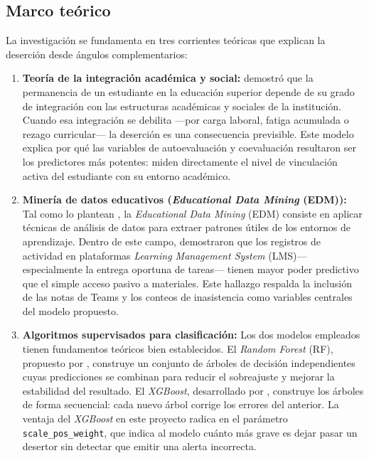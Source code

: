 \documentclass[12pt,letterpaper]{article}
\newcommand{\LMS}{\textit{Learning Management System} (LMS)\xspace}
\newcommand{\RF}{\textit{Random Forest} (RF)\xspace}
\newcommand{\XGB}{\textit{XGBoost}\xspace}
\newcommand{\EDM}{\textit{Educational Data Mining} (EDM)\xspace}
\begin{document}
\subsection{Marco teórico}

La investigación se fundamenta en tres corrientes teóricas que explican la deserción desde ángulos complementarios:

\begin{enumerate}
  \item \textbf{Teoría de la integración académica y social:} \textcite{tinto1975} demostró que la permanencia de un estudiante en la educación superior depende de su grado de integración con las estructuras académicas y sociales de la institución. Cuando esa integración se debilita —por carga laboral, fatiga acumulada o rezago curricular— la deserción es una consecuencia previsible. Este modelo explica por qué las variables de autoevaluación y coevaluación resultaron ser los predictores más potentes: miden directamente el nivel de vinculación activa del estudiante con su entorno académico.

  \item \textbf{Minería de datos educativos (\EDM):} Tal como lo plantean \textcite{romero2010}, la \EDM consiste en aplicar técnicas de análisis de datos para extraer patrones útiles de los entornos de aprendizaje. Dentro de este campo, \textcite{macfadyen2010} demostraron que los registros de actividad en plataformas \LMS —especialmente la entrega oportuna de tareas— tienen mayor poder predictivo que el simple acceso pasivo a materiales. Este hallazgo respalda la inclusión de las notas de Teams y los conteos de inasistencia como variables centrales del modelo propuesto.

  \item \textbf{Algoritmos supervisados para clasificación:} Los dos modelos empleados tienen fundamentos teóricos bien establecidos. El \RF, propuesto por \textcite{breiman2001}, construye un conjunto de árboles de decisión independientes cuyas predicciones se combinan para reducir el sobreajuste y mejorar la estabilidad del resultado. El \XGB, desarrollado por \textcite{chen2016}, construye los árboles de forma secuencial: cada nuevo árbol corrige los errores del anterior. La ventaja del \XGB en este proyecto radica en el parámetro \texttt{scale\_pos\_weight}, que indica al modelo cuánto más grave es dejar pasar un desertor sin detectar que emitir una alerta incorrecta.
\end{enumerate}
\end{document}
